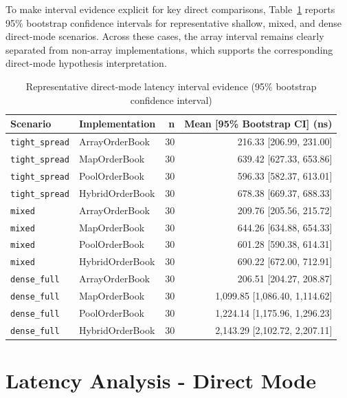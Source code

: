 To make interval evidence explicit for key direct comparisons, Table~\ref{tab:direct_key_latency_ci}
reports 95\% bootstrap confidence intervals for representative shallow, mixed, and dense
direct-mode scenarios. Across these cases, the array interval remains clearly
separated from non-array implementations, which supports the corresponding
direct-mode hypothesis interpretation.

\begin{table}[htbp]
    \centering
    \small
    \begin{tabular}{llrr}
        \toprule
        \textbf{Scenario} & \textbf{Implementation} & \textbf{n} & \textbf{Mean [95\% Bootstrap CI] (ns)} \\
        \midrule
        \texttt{tight\_spread} & ArrayOrderBook  & 30 & 216.33 [206.99, 231.00] \\
        \texttt{tight\_spread} & MapOrderBook    & 30 & 639.42 [627.33, 653.86] \\
        \texttt{tight\_spread} & PoolOrderBook   & 30 & 596.33 [582.37, 613.01] \\
        \texttt{tight\_spread} & HybridOrderBook & 30 & 678.38 [669.37, 688.33] \\
        \midrule
        \texttt{mixed} & ArrayOrderBook  & 30 & 209.76 [205.56, 215.72] \\
        \texttt{mixed} & MapOrderBook    & 30 & 644.26 [634.88, 654.33] \\
        \texttt{mixed} & PoolOrderBook   & 30 & 601.28 [590.38, 614.31] \\
        \texttt{mixed} & HybridOrderBook & 30 & 690.22 [672.00, 712.91] \\
        \midrule
        \texttt{dense\_full} & ArrayOrderBook  & 30 & 206.51 [204.27, 208.87] \\
        \texttt{dense\_full} & MapOrderBook    & 30 & 1,099.85 [1,086.40, 1,114.62] \\
        \texttt{dense\_full} & PoolOrderBook   & 30 & 1,224.14 [1,175.96, 1,296.23] \\
        \texttt{dense\_full} & HybridOrderBook & 30 & 2,143.29 [2,102.72, 2,207.11] \\
        \bottomrule
    \end{tabular}
    \caption{Representative direct-mode latency interval evidence (95\% bootstrap confidence interval)}
    \label{tab:direct_key_latency_ci}
\end{table}


\section{Latency Analysis - Direct Mode}

